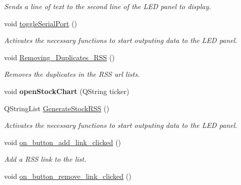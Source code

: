 \begin{DoxyCompactItemize}
\begin{DoxyCompactList}\small\item\em Sends a line of text to the second line of the L\+E\+D panel to display. \end{DoxyCompactList}\item 
\hypertarget{class_t_k_r_t_a_p_ad037f38e28ef942688d7ad6e0bf4a62c}{void \hyperlink{class_t_k_r_t_a_p_ad037f38e28ef942688d7ad6e0bf4a62c}{toggle\+Serial\+Port} ()}\label{class_t_k_r_t_a_p_ad037f38e28ef942688d7ad6e0bf4a62c}

\begin{DoxyCompactList}\small\item\em Activates the necessary functions to start outputing data to the L\+E\+D panel. \end{DoxyCompactList}\item 
\hypertarget{class_t_k_r_t_a_p_a7e405d4c3d7f022889242376072ce821}{void \hyperlink{class_t_k_r_t_a_p_a7e405d4c3d7f022889242376072ce821}{Removing\+\_\+\+Duplicates\+\_\+\+R\+S\+S} ()}\label{class_t_k_r_t_a_p_a7e405d4c3d7f022889242376072ce821}

\begin{DoxyCompactList}\small\item\em Removes the duplicates in the R\+S\+S url lists. \end{DoxyCompactList}\item 
\hypertarget{class_t_k_r_t_a_p_a0d824d019f7724b276db0622bd43adbf}{void {\bfseries open\+Stock\+Chart} (Q\+String ticker)}\label{class_t_k_r_t_a_p_a0d824d019f7724b276db0622bd43adbf}

\item 
Q\+String\+List \hyperlink{class_t_k_r_t_a_p_aa8df0b689d8e9c9ca53e040e55ae96c4}{Generate\+Stock\+R\+S\+S} ()
\begin{DoxyCompactList}\small\item\em Activates the necessary functions to start outputing data to the L\+E\+D panel. \end{DoxyCompactList}\item 
\hypertarget{class_t_k_r_t_a_p_a3d229ca32c81efcd046e2cc73c29455a}{void \hyperlink{class_t_k_r_t_a_p_a3d229ca32c81efcd046e2cc73c29455a}{on\+\_\+button\+\_\+add\+\_\+link\+\_\+clicked} ()}\label{class_t_k_r_t_a_p_a3d229ca32c81efcd046e2cc73c29455a}

\begin{DoxyCompactList}\small\item\em Add a R\+S\+S link to the list. \end{DoxyCompactList}\item 
\hypertarget{class_t_k_r_t_a_p_a9d26be9315aafb9afc2a134ea9d1ed0b}{void \hyperlink{class_t_k_r_t_a_p_a9d26be9315aafb9afc2a134ea9d1ed0b}{on\+\_\+button\+\_\+remove\+\_\+link\+\_\+clicked} ()}\label{class_t_k_r_t_a_p_a9d26be9315aafb9afc2a134ea9d1ed0b}


\end{DoxyCompactItemize}
